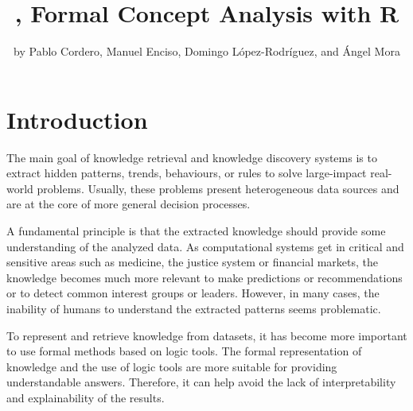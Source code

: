 \title{, Formal Concept Analysis with R}
\author{by Pablo Cordero, Manuel Enciso, Domingo López-Rodríguez, and Ángel
Mora}

\maketitle


\hypertarget{introduction}{%
\section{Introduction}\label{introduction}}

The main goal of knowledge retrieval and knowledge discovery systems is
to extract hidden patterns, trends, behaviours, or rules to solve
large-impact real-world problems. Usually, these problems present
heterogeneous data sources and are at the core of more general decision
processes.

A fundamental principle is that the extracted knowledge should provide
some understanding of the analyzed data. As computational systems get in
critical and sensitive areas such as medicine, the justice system or
financial markets, the knowledge becomes much more relevant to make
predictions or recommendations or to detect common interest groups or
leaders. However, in many cases, the inability of humans to understand
the extracted patterns seems problematic.

To represent and retrieve knowledge from datasets, it has become more
important to use formal methods based on logic tools. The formal
representation of knowledge and the use of logic tools are more suitable
for providing understandable answers. Therefore, it can help avoid the
lack of interpretability and explainability of the results.

